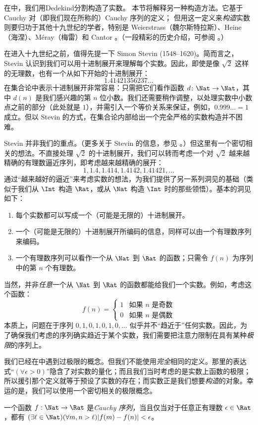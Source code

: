 \documentclass[../../../include/open-logic-section]{subfiles}
\begin{document}


在中，我们用Dedekind分割构造了实数。
本节将解释另一种构造方法。它基于 Cauchy 对（即我们现在所称的）Cauchy 序列的定义；
但用这一定义来\emph{构造}实数则要归功于其他十九世纪的学者，特别是 Weierstrass（魏尔斯特拉斯）、Heine（海涅）、M\'{e}ray（梅雷）和 Cantor 。（一段精彩的历史介绍，可参阅 \citeauthor{OConnorRobertson:RN} \citeyear{OConnorRobertson:RN}。）

在进入十九世纪之前，值得先提一下 Simon Stevin (1548--1620)。简而言之，Stevin 认识到我们可以用十进制展开来理解每个实数。因此，即使是像 $\sqrt{2}$ 这样的无理数，也有一个从如下开始的十进制展开：
\[
	1.41421356237\ldots
\]
在集合论中表示十进制展开非常容易：只需把它们看作函数 $d \colon \Nat \to \Nat$，其中 $d(n)$ 是我们感兴趣的第 $n$ 位小数。我们还需要稍作调整，以处理实数中小数点之前的部分（此处就是 $1$），并需引入一个等价关系来保证，例如，$0.999\ldots = 1$ 成立。但以 Stevin 的方式，在集合论内部给出一个完全严格的实数构造并不困难。

Stevin 并非我们的重点。（更多关于 Stevin 的信息，参见 \citealt{KatzKatz2012}。）但这里有一个密切相关的想法。不直接处理 $\sqrt{2}$ 的十进制展开，我们可以转而考虑一个对 $\sqrt{2}$ 越来越精确的有理数逼近序列，即考虑越来越精确的展开：
\[
1, 1.4, 1.414, 1.4142, 1.41421,\ldots
\]
通过“越来越好的逼近”来考虑实数的想法，为我们提供了另一系列洞见的基础（类似于我们从 $\Int$ 构造 $\Rat$，或从 $\Nat$ 构造 $\Int$ 时的那些领悟）。基本的洞见如下：
\begin{enumerate}
	\item 每个实数都可以写成一个（可能是无限的）十进制展开。
	\item 一个（可能是无限的）十进制展开所编码的信息，同样可以由一个有理数序列来编码。
	\item 一个有理数序列可以看作一个从 $\Nat$ 到 $\Rat$ 的函数；只需令 $f(n)$ 为序列中的第 $n$ 个有理数。
\end{enumerate}
当然，并非\emph{任意}一个从 $\Nat$ 到 $\Rat$ 的函数都能给我们一个实数。例如，考虑这个函数：
\[
	f(n) =\begin{cases}
			1 & \text{如果 }n\text{ 是奇数}\\
			0 &\text{如果 }n\text{ 是偶数}
		\end{cases}
\]
本质上，问题在于序列 $0,1,0,1,0,1,0,\ldots$
似乎并不“趋近于”任何实数。因此，为了确保我们考虑的序列确实趋近于某个实数，我们需要把注意力限制在具有某种\emph{极限}的序列上。

我们已经在中遇到过极限的概念。但我们不能使用\emph{完全}相同的定义。那里的表达式“$(\forall \epsilon>0)$”隐含了对实数的量化；而且我们当时考虑的是实数上函数的极限；所以援引那个定义就等于预设了实数的存在；而实数正是我们想要\emph{构造}的对象。幸运的是，我们可以使用一个密切相关的极限概念。
\begin{defn}
  一个函数 $f: \Nat \to \Rat$ 是\emph{Cauchy 序列}，当且仅当对于任意正有理数 $\epsilon \in \Rat$，都有 $(\exists \ell \in
  \Nat)(\forall m, n > \ell)|f(m) - f(n)| < \epsilon$。
\end{defn}
\end{document}
